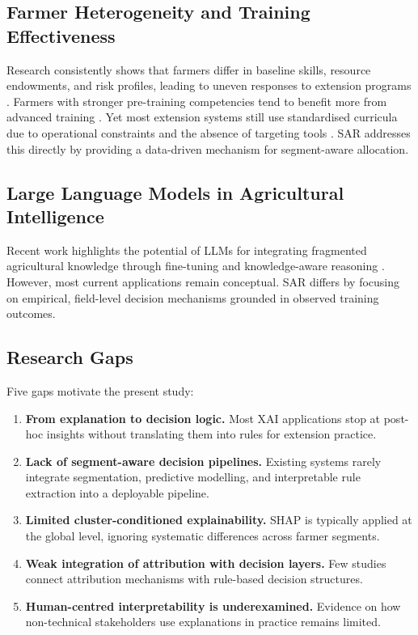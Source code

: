 \documentclass[3p,twocolumn,authoryear]{elsarticle}
\begin{document}
\subsection{Farmer Heterogeneity and Training Effectiveness}

Research consistently shows that farmers differ in baseline skills,
resource endowments, and risk profiles, leading to uneven responses to
extension programs \citep{feder1985,anderson2004}.
Farmers with stronger pre-training competencies tend to benefit more from
advanced training \citep{davis2012}.
Yet most extension systems still use standardised curricula due to
operational constraints and the absence of targeting tools
\citep{anderson2004}.
SAR addresses this directly by providing a data-driven mechanism for
segment-aware allocation.

\subsection{Large Language Models in Agricultural Intelligence}

Recent work highlights the potential of LLMs for integrating fragmented
agricultural knowledge through fine-tuning and knowledge-aware reasoning
\citep{li2025llm}.
However, most current applications remain conceptual.
SAR differs by focusing on empirical, field-level decision mechanisms
grounded in observed training outcomes.

\subsection{Research Gaps}

Five gaps motivate the present study:

\begin{enumerate}
  \item \textbf{From explanation to decision logic.}
  Most XAI applications stop at post-hoc insights without translating them
  into rules for extension practice.

  \item \textbf{Lack of segment-aware decision pipelines.}
  Existing systems rarely integrate segmentation, predictive modelling,
  and interpretable rule extraction into a deployable pipeline.

  \item \textbf{Limited cluster-conditioned explainability.}
  SHAP is typically applied at the global level, ignoring systematic
  differences across farmer segments.

  \item \textbf{Weak integration of attribution with decision layers.}
  Few studies connect attribution mechanisms with rule-based decision
  structures.

  \item \textbf{Human-centred interpretability is underexamined.}
  Evidence on how non-technical stakeholders use explanations in practice
  remains limited.
\end{enumerate}
\end{document}
